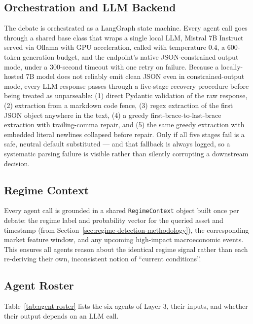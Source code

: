 \subsection{Orchestration and LLM Backend}
\label{subsec:agent-orchestration}

The debate is orchestrated as a LangGraph state machine. Every agent call goes through a shared base class that wraps a single local LLM, Mistral 7B Instruct \cite{mistral2023} served via Ollama with GPU acceleration, called with temperature 0.4, a 600-token generation budget, and the endpoint's native JSON-constrained output mode, under a 300-second timeout with one retry on failure. Because a locally-hosted 7B model does not reliably emit clean JSON even in constrained-output mode, every LLM response passes through a five-stage recovery procedure before being treated as unparseable: (1) direct Pydantic validation of the raw response, (2) extraction from a markdown code fence, (3) regex extraction of the first JSON object anywhere in the text, (4) a greedy first-brace-to-last-brace extraction with trailing-comma repair, and (5) the same greedy extraction with embedded literal newlines collapsed before repair. Only if all five stages fail is a safe, neutral default substituted --- and that fallback is always logged, so a systematic parsing failure is visible rather than silently corrupting a downstream decision.

\subsection{Regime Context}
\label{subsec:regime-context}

Every agent call is grounded in a shared \texttt{RegimeContext} object built once per debate: the regime label and probability vector for the queried asset and timestamp (from Section~\ref{sec:regime-detection-methodology}), the corresponding market feature window, and any upcoming high-impact macroeconomic events. This ensures all agents reason about the identical regime signal rather than each re-deriving their own, inconsistent notion of ``current conditions''.

\subsection{Agent Roster}
\label{subsec:agent-roster}

Table~\ref{tab:agent-roster} lists the six agents of Layer 3, their inputs, and whether their output depends on an LLM call.

